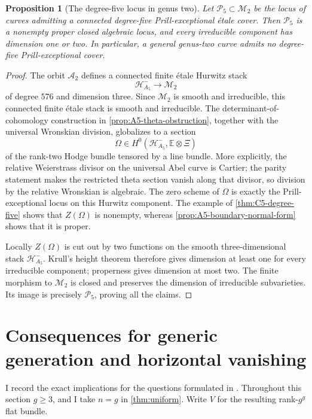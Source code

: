 \documentclass[11pt,reqno]{amsart}
\numberwithin{equation}{section}
\newtheorem{proposition}[proposition]{Proposition}
\theoremstyle{remark}
\begin{document}
\begin{proposition}[The degree-five locus in genus two]
\label{prop:degree-five-locus}
Let \(\mathcal P_5\subset\mathcal M_2\) be the locus of curves admitting
a connected degree-five Prill-exceptional \'etale cover.  Then
\(\mathcal P_5\) is a nonempty proper closed algebraic locus, and every
irreducible component has dimension one or two.  In particular, a
general genus-two curve admits no degree-five Prill-exceptional cover.
\end{proposition}

\begin{proof}
The orbit \(\mathcal A_2\) defines a connected finite \'etale Hurwitz
stack
\[
 \mathcal H^-_{A_5}\longrightarrow\mathcal M_2
\]
of degree \(576\) and dimension three.  Since \(\mathcal M_2\) is smooth
and irreducible, this connected finite \'etale stack is smooth and
irreducible.  The determinant-of-cohomology
construction in \cref{prop:A5-theta-obstruction}, together with the
universal Wronskian division, globalizes to a section
\[
 \Omega\in H^0(\mathcal H^-_{A_5},\mathbb E\otimes\Xi)
\]
of the rank-two Hodge bundle tensored by a line bundle.  More explicitly,
the relative Weierstrass divisor on the universal Abel curve is Cartier;
the parity statement makes the restricted theta section vanish along
that divisor, so division by the relative Wronskian is algebraic.  The
zero scheme of \(\Omega\)
is exactly the Prill-exceptional locus on this Hurwitz component.  The
example of \cref{thm:C5-degree-five} shows that \(Z(\Omega)\) is nonempty,
whereas \cref{prop:A5-boundary-normal-form} shows that it is proper.

Locally \(Z(\Omega)\) is cut out by two functions on the smooth
three-dimensional stack \(\mathcal H^-_{A_5}\).  Krull's height theorem
therefore gives dimension at least one for every irreducible component;
properness gives dimension at most two.  The finite morphism to
\(\mathcal M_2\) is closed and preserves the dimension of irreducible
subvarieties.  Its image is precisely \(\mathcal P_5\), proving all the
claims.
\end{proof}

\section{Consequences for generic generation and horizontal vanishing}

I record the exact implications for the questions formulated in
\cite[\S6.3]{LittMotives}.  Throughout this section \(g\geq3\), and I
take \(n=g\) in \cref{thm:uniform}.  Write \(V\) for the resulting
rank-\(g^g\) flat bundle.
\end{document}

